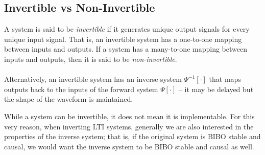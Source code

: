 \documentclass{report}
\begin{document}
\subsection{Invertible vs Non-Invertible}
A system is said to be \emph{invertible} if it generates unique output signals for every unique input signal. That is, an invertible system has a one-to-one mapping between 
inputs and outputs. If a system has a many-to-one mapping between inputs and outputs, then it is said to be \emph{non-invertible}. 
\\ \\
Alternatively, an invertible system has an inverse system $\Psi^{-1}[\cdot]$ that maps outputs back to the inputs of the forward system $\Psi[\cdot]$ -- it may be delayed but the shape of the waveform is maintained. 
\begin{center}
\end{center}
\begin{center}
\end{center}
While a system can be invertible, it does not mean it is implementable. For this very reason, when inverting LTI systems, generally we are also interested in the properties of the 
inverse system; that is, if the original system is BIBO stable and causal, we would want the inverse system to be BIBO stable and causal as well. 
\end{document}
